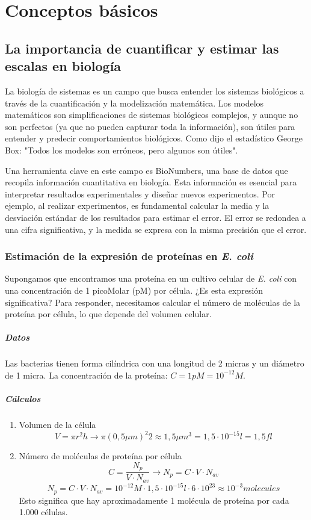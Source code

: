\chapter{Conceptos básicos}
\section{La importancia de cuantificar y estimar las escalas en biología}
La biología de sistemas es un campo que busca entender los sistemas biológicos a través de la cuantificación y la modelización matemática. Los modelos matemáticos son simplificaciones de sistemas biológicos complejos, y aunque no son perfectos (ya que no pueden capturar toda la información), son útiles para entender y predecir comportamientos biológicos. Como dijo el estadístico George Box: "Todos los modelos son erróneos, pero algunos son útiles".

Una herramienta clave en este campo es BioNumbers, una base de datos que recopila información cuantitativa en biología. Esta información es esencial para interpretar resultados experimentales y diseñar nuevos experimentos. Por ejemplo, al realizar experimentos, es fundamental calcular la media y la desviación estándar de los resultados para estimar el error. El error se redondea a una cifra significativa, y la medida se expresa con la misma precisión que el error.

\subsection{Estimación de la expresión de proteínas en \textit{E. coli}}
Supongamos que encontramos una proteína en un cultivo celular de \textit{E. coli} con una concentración de 1 picoMolar (pM) por célula. ¿Es esta expresión significativa? Para responder, necesitamos calcular el número de moléculas de la proteína por célula, lo que depende del volumen celular.

\paragraph{Datos} Las bacterias tienen forma cilíndrica con una longitud de 2 micras y un diámetro de 1 micra. La concentración de la proteína: $C = 1 pM = 10^{-12}M$.

\paragraph{Cálculos}
\begin{enumerate}
\item Volumen de la célula
$$V = \pi r^2 h \rightarrow \pi (0,5 \mu m)^2 2 \approx 1,5 \mu m^3 = 1,5 \cdot 10^{-15} l = 1,5 fl$$
\item Número de moléculas de proteína por célula
$$C = \frac{N_p}{V \cdot N_{av}} \rightarrow N_p = C \cdot V \cdot N_{av}$$
$$N_p = C \cdot V \cdot N_{av} = 10^{-12}M \cdot 1,5 \cdot 10^{-15}l \cdot 6 \cdot 10^{23} \approx 10^{-3} molecules$$
Esto significa que hay aproximadamente 1 molécula de proteína por cada 1.000 células.
\end{enumerate}

